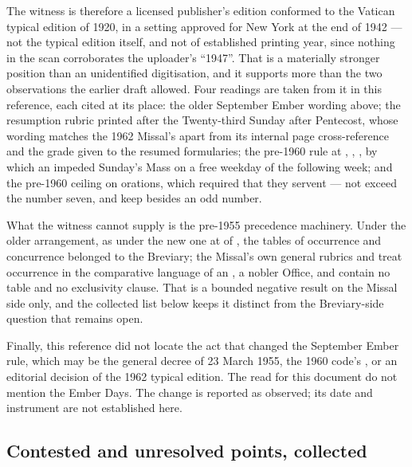 The witness is therefore a licensed publisher's edition conformed to the Vatican typical edition
of 1920, in a setting approved for New York at the end of 1942 — not the typical edition itself,
and not of established printing year, since nothing in the scan corroborates the uploader's
``1947''. That is a materially stronger position than an unidentified digitisation, and it
supports more than the two observations the earlier draft allowed. Four readings are taken from
it in this reference, each cited at its place: the older September Ember wording above; the
resumption rubric printed after the Twenty-third Sunday after Pentecost, whose wording matches
the 1962 Missal's apart from its internal page cross-reference and the grade
 given to the resumed formularies; the pre-1960 rule at
, , ,
by which an impeded Sunday's Mass  on a free weekday
of the following week; and the pre-1960 ceiling on orations, which required that they
 servent — not exceed
the number seven, and keep besides an odd number.

What the witness cannot supply is the pre-1955 precedence machinery. Under the older
arrangement, as under the new one at  of , the tables of
occurrence and concurrence belonged to the Breviary; the Missal's own general rubrics and
 treat occurrence in the comparative language of an
, a nobler Office, and contain no table and no exclusivity clause. That
is a bounded negative result on the Missal side only, and the collected list below keeps it
distinct from the Breviary-side question that remains open.

Finally, this reference did not locate the act that changed the September Ember rule, which may
be the general decree of 23 March 1955, the 1960 code's , or an editorial
decision of the 1962 typical edition. The  read for this
document do not mention the Ember Days. The change is reported as observed; its date and
instrument are not established here.

\subsection{Contested and unresolved points, collected}

